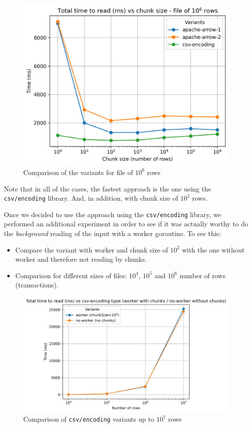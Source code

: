 \documentclass{article}
\begin{document}
\begin{figure}[H]
  \centering
  \includegraphics[scale = 0.7]{images/read-input-10-6.png}
  \caption{Comparison of the variants for file of $10^6$ rows}
\end{figure}

Note that in all of the cases, the fastest approach is the one using the \texttt{csv/encoding} library. And, in addition, with chunk size of $10^2$ rows.

Once we decided to use the approach using the \texttt{csv/encoding} library, we performed an additional experiment in order to see if it was actually worthy to do the \emph{background} reading of the input with a worker goroutine. To see this:

\begin{itemize}
  \item Compare the variant with worker and chunk size of $10^2$ with the one without worker and therefore not reading by chunks.
  \item Comparison for different sizes of files: $10^4$, $10^5$ and $10^6$ number of rows (transactions).
\end{itemize}

\begin{figure}[H]
  \centering
  \includegraphics[scale = 0.7]{images/read-input-csv-encoding-all.png}
  \caption{Comparison of \texttt{csv/encoding} variants up to $10^7$ rows}
\end{figure}
\end{document}

